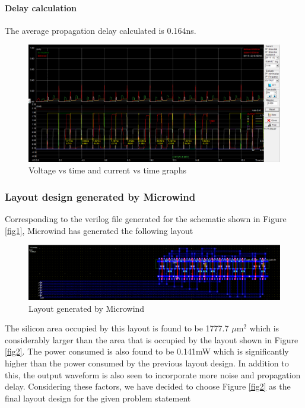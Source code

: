 \documentclass[titlepage]{article}
\begin{document}
\paragraph*{Delay calculation}
The average propagation delay calculated is 0.164ns.
\begin{figure}[ht]
    \centering
    \includegraphics[scale = 0.4]{voltandcurrent_Ass1a.png}
    \caption{Voltage vs time and current vs time graphs}
\end{figure}

\subsubsection{Layout design generated by Microwind}
Corresponding to the verilog file generated for the schematic shown in Figure \ref{fig1}, Microwind has generated the following layout
\begin{figure}[ht]
    \centering
    \includegraphics[scale = 0.40]{mwlayout.png}
    \caption{Layout generated by Microwind}
\end{figure} \newline
The silicon area occupied by this layout is found to be 1777.7 $\mu \text{m}^2$ which is considerably larger than the area that is occupied by the layout shown in Figure \ref{fig2}. The power consumed is also found to be 0.141mW which is significantly higher than the power consumed by the previous layout design.
In addition to this, the output waveform is also seen to incorporate more noise and propagation delay. Considering these factors, we have decided to choose Figure \ref{fig2} as the final layout design for the given problem statement
\end{document}
